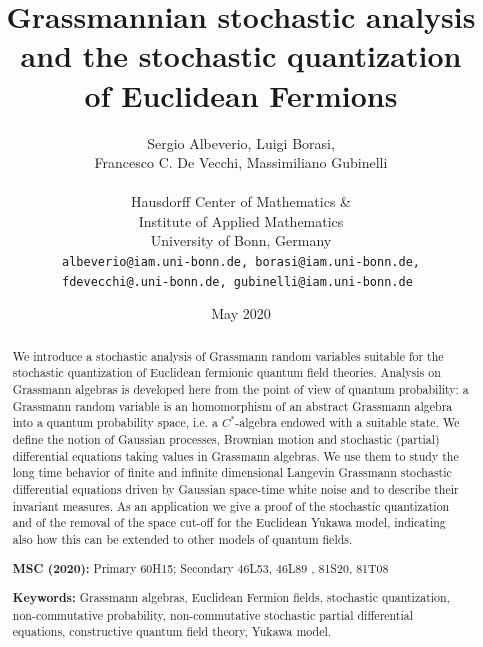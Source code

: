 \documentclass[11pt]{article}
\newcommand{\tmaffiliation}[1]{\\ #1}
\newcommand{\tmsep}{, }
\newcommand{\tmkeywords}{\textbf{Keywords:} }
\newcommand{\tmmsc}{\textbf{MSC (2020):} }
\begin{document}
\title{\textbf{
  Grassmannian stochastic analysis\\
  and the stochastic quantization\\
  of Euclidean Fermions}
}

\author{Sergio Albeverio, Luigi Borasi,\\ Francesco C. De Vecchi, Massimiliano Gubinelli\\[.5em]
  \tmaffiliation{Hausdorff Center of Mathematics \&\\
  Institute of Applied Mathematics\\
  University of Bonn, Germany}\\[.2em]
  \tt{\small albeverio@iam.uni-bonn.de, borasi@iam.uni-bonn.de,}\\
  \tt{\small fdevecchi@.uni-bonn.de, gubinelli@iam.uni-bonn.de}
}

\date{May 2020}

\maketitle

\begin{abstract}
  We introduce a stochastic analysis of Grassmann random variables suitable
  for the stochastic quantization of Euclidean fermionic quantum field
  theories. Analysis on Grassmann algebras is developed here from the point of
  view of quantum probability: a Grassmann random variable is an homomorphism
  of an abstract Grassmann algebra into a quantum probability space, i.e. a
  $C^{\ast}$-algebra endowed with a suitable state. We define the notion of
  Gaussian processes, Brownian motion and stochastic (partial) differential
  equations taking values in Grassmann algebras. We use them to study the long
  time behavior of finite and infinite dimensional Langevin Grassmann
  stochastic differential equations driven by Gaussian space-time white noise
  and to describe their invariant measures. As an application we give a proof
  of the stochastic quantization and of the removal of the space cut-off for
  the Euclidean Yukawa model, indicating also how this can be extended to
  other models of quantum fields.\\[.5em]

{\footnotesize
\noindent \tmmsc Primary {60H15}; Secondary {46L53}{\tmsep}{46L89} {\tmsep}{81S20}{\tmsep}  {81T08}

\noindent \tmkeywords{Grassmann algebras, Euclidean Fermion fields, stochastic
quantization, non-commutative probability, non-commutative stochastic partial
differential equations, constructive quantum field theory, Yukawa model.}
}
\end{abstract}
\end{document}
